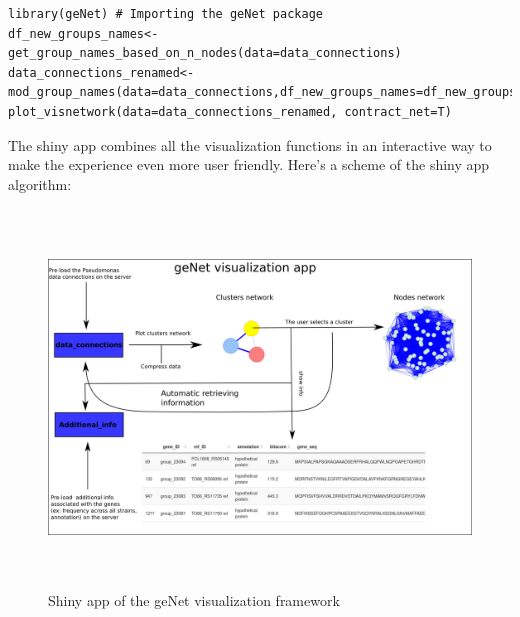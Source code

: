 \documentclass{article}
\begin{document}
\begin{framed}
\begin{lstlisting}
library(geNet) # Importing the geNet package
df_new_groups_names<-get_group_names_based_on_n_nodes(data=data_connections)
data_connections_renamed<-mod_group_names(data=data_connections,df_new_groups_names=df_new_groups_names)
plot_visnetwork(data=data_connections_renamed, contract_net=T)
\end{lstlisting}
\end{framed}
The shiny app combines all the visualization functions in an interactive way to make the experience even more user friendly.
Here's a scheme of the shiny app algorithm:

\begin{figure}[H]
\includegraphics[width=18cm, height=10cm]{./Figures/visualization_framework_scheme.png}
\centering
\caption{Shiny app of the geNet visualization framework}
\label{fig:genetvisualization}
\end{figure}
\end{document}
